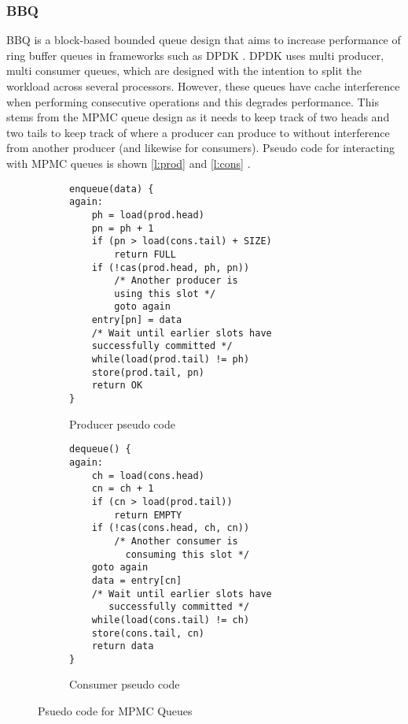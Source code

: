 \subsubsection{BBQ}
BBQ is a block-based bounded queue design that aims to increase performance of ring buffer queues in frameworks such
as DPDK \cite{Wang_BFOOLCHC_22}. DPDK uses multi producer, multi consumer queues, which are designed with the
intention to split the workload across several processors. However, these queues have cache interference when
performing consecutive operations and this degrades performance. This stems from the MPMC queue design as it needs to keep track of
two heads and two tails to keep track of where a producer can produce to without interference from another producer (and
likewise for consumers). Pseudo code for interacting with MPMC queues is shown \autoref{l:prod} and \autoref{l:cons} 
\cite{Wang_BFOOLCHC_22}.


\begin{figure} [H]
	\begin{multicols}{2}
		\begin{subfigure}{0.45\textwidth}
		\begin{verbatim}
enqueue(data) {
again:
    ph = load(prod.head)
    pn = ph + 1
    if (pn > load(cons.tail) + SIZE)
	    return FULL
    if (!cas(prod.head, ph, pn))
        /* Another producer is 
        using this slot */
        goto again
    entry[pn] = data
    /* Wait until earlier slots have
    successfully committed */
    while(load(prod.tail) != ph)
    store(prod.tail, pn)
    return OK
}
    \end{verbatim}
    \caption{Producer pseudo code}
    \label{l:prod}
    \end{subfigure}\hfill
    \begin{subfigure}{0.45\textwidth}
    \begin{verbatim}
dequeue() {
again:
    ch = load(cons.head)
    cn = ch + 1
    if (cn > load(prod.tail))
        return EMPTY
    if (!cas(cons.head, ch, cn))
        /* Another consumer is 
          consuming this slot */
    goto again
    data = entry[cn]
    /* Wait until earlier slots have 
       successfully committed */
    while(load(cons.tail) != ch)
    store(cons.tail, cn)
    return data
}
    \end{verbatim}
    \caption{Consumer pseudo code}
    \label{l:cons}
    \end{subfigure}
\end{multicols}
\caption{Psuedo code for MPMC Queues}
\label{l:mpmc}
\end{figure}

